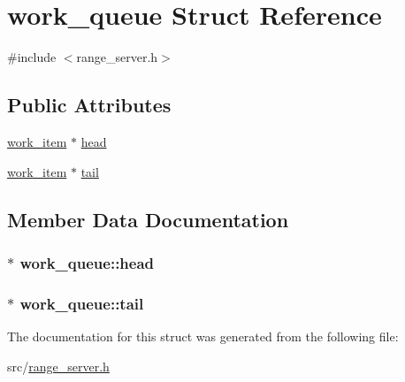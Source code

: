 \hypertarget{structwork__queue}{\section{work\-\_\-queue Struct Reference}
\label{da/d81/structwork__queue}
}


{\ttfamily \#include $<$range\-\_\-server.\-h$>$}

\subsection*{Public Attributes}
\begin{DoxyCompactItemize}
\item 
\hyperlink{structwork__item}{work\-\_\-item} $\ast$ \hyperlink{structwork__queue_ae23ecfba9f307e8b4f4b120766067f19}{head}
\item 
\hyperlink{structwork__item}{work\-\_\-item} $\ast$ \hyperlink{structwork__queue_a0978e900d44a1f2213c9b42e51dbef7a}{tail}
\end{DoxyCompactItemize}


\subsection{Member Data Documentation}
\hypertarget{structwork__queue_ae23ecfba9f307e8b4f4b120766067f19}{
\subsubsection[{head}]{$\ast$ work\-\_\-queue\-::head}}\label{da/d81/structwork__queue_ae23ecfba9f307e8b4f4b120766067f19}
\hypertarget{structwork__queue_a0978e900d44a1f2213c9b42e51dbef7a}{
\subsubsection[{tail}]{$\ast$ work\-\_\-queue\-::tail}}\label{da/d81/structwork__queue_a0978e900d44a1f2213c9b42e51dbef7a}


The documentation for this struct was generated from the following file\-:\begin{DoxyCompactItemize}
\item 
src/\hyperlink{range__server_8h}{range\-\_\-server.\-h}\end{DoxyCompactItemize}

